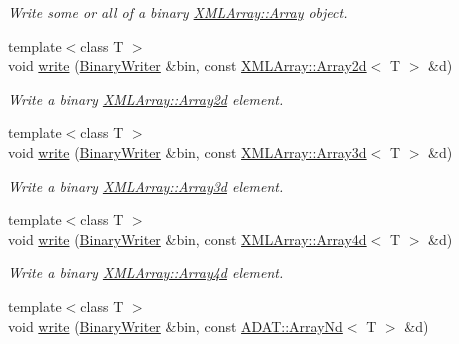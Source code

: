 \begin{DoxyCompactItemize}
\begin{DoxyCompactList}\small\item\em Write some or all of a binary \mbox{\hyperlink{classXMLArray_1_1Array}{X\+M\+L\+Array\+::\+Array}} object. \end{DoxyCompactList}\item 
{\footnotesize template$<$class T $>$ }\\void \mbox{\hyperlink{namespaceADATIO_a6e67aa5fde8e34135bde219592b6b55a}{write}} (\mbox{\hyperlink{classADATIO_1_1BinaryWriter}{Binary\+Writer}} \&bin, const \mbox{\hyperlink{classXMLArray_1_1Array2d}{X\+M\+L\+Array\+::\+Array2d}}$<$ T $>$ \&d)
\begin{DoxyCompactList}\small\item\em Write a binary \mbox{\hyperlink{classXMLArray_1_1Array2d}{X\+M\+L\+Array\+::\+Array2d}} element. \end{DoxyCompactList}\item 
{\footnotesize template$<$class T $>$ }\\void \mbox{\hyperlink{namespaceADATIO_a7fbf1297a893fe12c3b03b9594408829}{write}} (\mbox{\hyperlink{classADATIO_1_1BinaryWriter}{Binary\+Writer}} \&bin, const \mbox{\hyperlink{classXMLArray_1_1Array3d}{X\+M\+L\+Array\+::\+Array3d}}$<$ T $>$ \&d)
\begin{DoxyCompactList}\small\item\em Write a binary \mbox{\hyperlink{classXMLArray_1_1Array3d}{X\+M\+L\+Array\+::\+Array3d}} element. \end{DoxyCompactList}\item 
{\footnotesize template$<$class T $>$ }\\void \mbox{\hyperlink{namespaceADATIO_ad3c579901108d678f21ec1a97d0ab197}{write}} (\mbox{\hyperlink{classADATIO_1_1BinaryWriter}{Binary\+Writer}} \&bin, const \mbox{\hyperlink{classXMLArray_1_1Array4d}{X\+M\+L\+Array\+::\+Array4d}}$<$ T $>$ \&d)
\begin{DoxyCompactList}\small\item\em Write a binary \mbox{\hyperlink{classXMLArray_1_1Array4d}{X\+M\+L\+Array\+::\+Array4d}} element. \end{DoxyCompactList}\item 
{\footnotesize template$<$class T $>$ }\\void \mbox{\hyperlink{namespaceADATIO_a0f804d3b56353fad83984a5668212660}{write}} (\mbox{\hyperlink{classADATIO_1_1BinaryWriter}{Binary\+Writer}} \&bin, const \mbox{\hyperlink{classADAT_1_1ArrayNd}{A\+D\+A\+T\+::\+Array\+Nd}}$<$ T $>$ \&d)

\end{DoxyCompactItemize}
